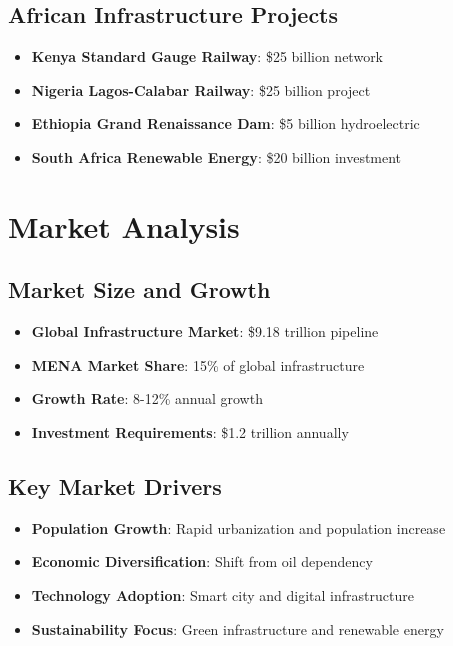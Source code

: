 \documentclass[business]{../templates/infraradar-main}
\begin{document}
\subsection{African Infrastructure Projects}
\begin{itemize}
    \item \textbf{Kenya Standard Gauge Railway}: \$25 billion network
    \item \textbf{Nigeria Lagos-Calabar Railway}: \$25 billion project
    \item \textbf{Ethiopia Grand Renaissance Dam}: \$5 billion hydroelectric
    \item \textbf{South Africa Renewable Energy}: \$20 billion investment
\end{itemize}

\section{Market Analysis}

\subsection{Market Size and Growth}
\begin{itemize}
    \item \textbf{Global Infrastructure Market}: \$9.18 trillion pipeline
    \item \textbf{MENA Market Share}: 15\% of global infrastructure
    \item \textbf{Growth Rate}: 8-12\% annual growth
    \item \textbf{Investment Requirements}: \$1.2 trillion annually
\end{itemize}

\subsection{Key Market Drivers}
\begin{itemize}
    \item \textbf{Population Growth}: Rapid urbanization and population increase
    \item \textbf{Economic Diversification}: Shift from oil dependency
    \item \textbf{Technology Adoption}: Smart city and digital infrastructure
    \item \textbf{Sustainability Focus}: Green infrastructure and renewable energy
\end{itemize}
\end{document}
